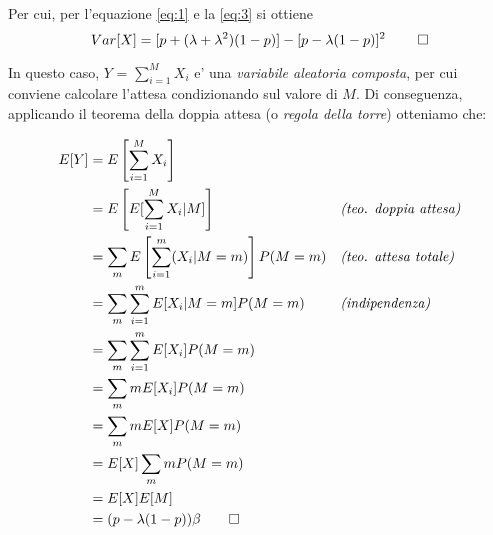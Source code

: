 \documentclass{homework}
\begin{document}
Per cui, per l'equazione \ref{eq:1} e la \ref{eq:3} si ottiene
\[
Var[X] = [p + (\lambda + \lambda^2) (1 - p)] - [p- \lambda (1 - p)]^2 \; \qed
\]

\exercise*[1.c]
In questo caso, $Y$ = $\sum_{i=1}^{M} X_i$ e' una \emph{variabile aleatoria composta}, per cui conviene calcolare 
l'attesa condizionando sul valore di $M$. Di conseguenza, applicando il teorema della doppia attesa (o 
\emph{regola della torre}) otteniamo che:

\[
\begin{align}
E[Y] &= E \left[ \sum_{i=1}^M X_i \right] && \\
     &= E \left[ E[\sum_{i=1}^M X_i | M]\right] && \emph{(teo. doppia attesa)}\\ 
     &= \sum_{m}E\left[\sum_{i=1}^m(X_i|M=m)\right]P(M=m) &&  \emph{(teo. attesa totale)}\\ 
     &= \sum_{m}\sum_{i=1}^mE[X_i|M=m]P(M=m) && \emph{(indipendenza)} \\ 
     &= \sum_{m}\sum_{i=1}^{m}E[X_i]P(M=m)\\
     &= \sum_{m} mE[X_i]P(M=m)\\
     &= \sum_{m} mE[X]P(M=m) \\
     &= E[X]\sum_{m}mP(M=m) \\
     &= E[X]E[M] \\
     &= (p-\lambda(1-p))\beta 
     \qed
\end{align}
\]
\end{document}
